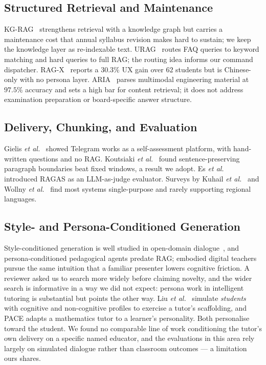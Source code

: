 \documentclass[conference]{IEEEtran}
\begin{document}
\subsection{Structured Retrieval and Maintenance}
KG-RAG~\cite{dong2025} strengthens retrieval with a knowledge graph but carries
a maintenance cost that annual syllabus revision makes hard to sustain; we keep
the knowledge layer as re-indexable text. URAG~\cite{nguyen2025} routes FAQ
queries to keyword matching and hard queries to full RAG; the routing idea
informs our command dispatcher. RAG-X~\cite{he2025} reports a $30.3\%$ UX gain
over $62$ students but is Chinese-only with no persona layer.
ARIA~\cite{luo2026} parses multimodal engineering material at $97.5\%$ accuracy
and sets a high bar for content retrieval; it does not address examination
preparation or board-specific answer structure.

\subsection{Delivery, Chunking, and Evaluation}
Gielis \textit{et al.}~\cite{gielis2025} showed Telegram works as a
self-assessment platform, with hand-written questions and no RAG.
Koutsiaki \textit{et al.}~\cite{koutsiaki2025} found sentence-preserving
paragraph boundaries beat fixed windows, a result we adopt.
Es \textit{et al.}~\cite{es2025} introduced RAGAS as an LLM-as-judge evaluator.
Surveys by Kuhail \textit{et al.}~\cite{kuhail2023} and
Wollny \textit{et al.}~\cite{wollny2021} find most systems single-purpose and
rarely supporting regional languages.

\subsection{Style- and Persona-Conditioned Generation}
Style-conditioned generation is well studied in open-domain
dialogue~\cite{li2023}, and persona-conditioned pedagogical agents predate RAG;
embodied digital teachers~\cite{zhao2024} pursue the same intuition that a
familiar presenter lowers cognitive friction.
A reviewer asked us to search more widely before claiming novelty, and the
wider search is informative in a way we did not expect: persona work in
intelligent tutoring is substantial but points the other way. Liu
\textit{et al.}~\cite{liu2024persona} simulate \emph{students} with cognitive
and non-cognitive profiles to exercise a tutor's scaffolding, and PACE
\cite{liu2025pace} adapts a mathematics tutor to a learner's personality.
Both personalise toward the student. We found no comparable line of work
conditioning the tutor's own delivery on a specific named educator, and the
evaluations in this area rely largely on simulated dialogue rather than
classroom outcomes --- a limitation ours shares.
\end{document}
